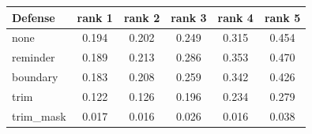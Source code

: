 \begin{tabular}{lccccc}
\hline
Defense & rank 1 & rank 2 & rank 3 & rank 4 & rank 5 \\
\hline
none & 0.194 & 0.202 & 0.249 & 0.315 & 0.454 \\
reminder & 0.189 & 0.213 & 0.286 & 0.353 & 0.470 \\
boundary & 0.183 & 0.208 & 0.259 & 0.342 & 0.426 \\
trim & 0.122 & 0.126 & 0.196 & 0.234 & 0.279 \\
trim\_mask & 0.017 & 0.016 & 0.026 & 0.016 & 0.038 \\
\hline
\end{tabular}
